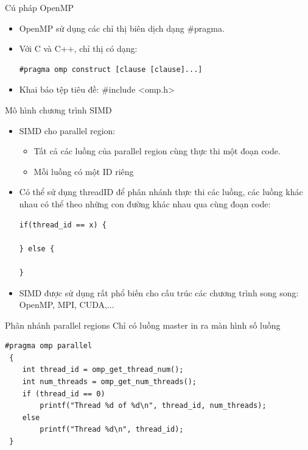 \documentclass[10pt]{beamer}
\theoremstyle{remark}
\numberwithin{algocf}{section}
\numberwithin{equation}{section}
\numberwithin{dl}{section}
\numberwithin{figure}{section}
\begin{document}
\begin{frame}[fragile]{Cú pháp OpenMP}
    \begin{itemize}
        \item OpenMP sử dụng các chỉ thị biên dịch dạng \#pragma.
        \item Với C và C++, chỉ thị có dạng:
        \begin{verbatim}
#pragma omp construct [clause [clause]...]
        \end{verbatim}
        \item Khai báo tệp tiêu đề: \#include <omp.h>
    \end{itemize}
\end{frame}

\begin{frame}[fragile]{Mô hình chương trình SIMD}
    \begin{itemize}
        \item SIMD cho parallel region:
        \begin{itemize}
            \item Tất cả các luồng của parallel region cùng thực thi một đoạn code.
            \item Mỗi luồng có một ID riêng
        \end{itemize}
        \item Có thể sử dụng threadID để phân nhánh thực thi các luồng, các luồng khác nhau có thể theo những con đường khác nhau qua cùng đoạn code:
        \begin{verbatim}
if(thread_id == x) {

} else {

}
        \end{verbatim}
        \item SIMD được sử dụng rất phổ biến cho cấu trúc các chương trình song song: OpenMP, MPI, CUDA,...
    \end{itemize}
\end{frame}

\begin{frame}[fragile]{Phân nhánh parallel regions}
    Chỉ có luồng master in ra màn hình số luồng
        \begin{verbatim}
#pragma omp parallel
 {
    int thread_id = omp_get_thread_num(); 
    int num_threads = omp_get_num_threads();
    if (thread_id == 0) 
        printf("Thread %d of %d\n", thread_id, num_threads); 
    else 
        printf("Thread %d\n", thread_id);
 }
        \end{verbatim}
\end{frame}
\end{document}
